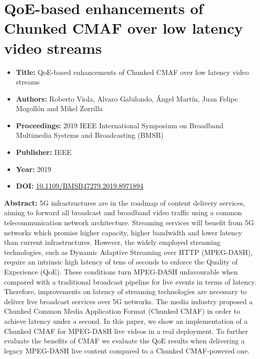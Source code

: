 \newcommand{\PublicationsPath}{PatentsAndPublications/Publications}


\section[QoE-based enhancements of Chunked CMAF over low latency video streams]{QoE-based enhancements of Chunked CMAF over low latency video streams}
\label{chap:BMSB2019}
\begin{itemize} \itemsep1pt\parskip0pt
	\item \textbf{Title:} QoE-based enhancements of Chunked CMAF over low latency video streams
	\item \textbf{Authors:} Roberto Viola, Alvaro Gabilondo, \'Angel Mart\'in, Juan Felipe Mogoll\'on and Mikel Zorrilla
	\item \textbf{Proceedings:} 2019 IEEE International Symposium on Broadband Multimedia Systems and Broadcasting (BMSB)
 	\item \textbf{Publisher:} IEEE
	\item \textbf{Year:} 2019
	\item \textbf{DOI:}  \url{10.1109/BMSB47279.2019.8971894}
\end{itemize}	

\textbf{Abstract:} 5G infrastructures are in the roadmap of content delivery services, aiming to forward all broadcast and broadband video traffic using a common telecommunication network architecture. Streaming services will benefit from 5G networks which promise higher capacity, higher bandwidth and lower latency than current infrastructures. However, the widely employed streaming technologies, such as Dynamic Adaptive Streaming over HTTP (MPEG-DASH), require an intrinsic high latency of tens of seconds to enforce the Quality of Experience (QoE). These conditions turn MPEG-DASH unfavourable when compared with a traditional broadcast pipeline for live events in terms of latency. Therefore, improvements on latency of streaming technologies are necessary to deliver live broadcast services over 5G networks. The media industry proposed a Chunked Common Media Application Format (Chunked CMAF) in order to achieve latency under a second. In this paper, we show an implementation of a Chunked CMAF for MPEG-DASH live videos in a real deployment. To further evaluate the benefits of CMAF we evaluate the QoE results when delivering a legacy MPEG-DASH live content compared to a Chunked CMAF-powered one.

